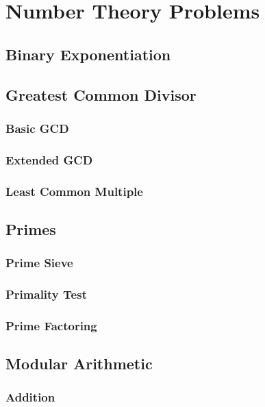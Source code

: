 \section{Number Theory Problems}

\subsection{Binary Exponentiation}

\subsection{Greatest Common Divisor}

\subsubsection{Basic GCD}

\subsubsection{Extended GCD}

\subsubsection{Least Common Multiple}

\subsection{Primes}

\subsubsection{Prime Sieve}

\subsubsection{Primality Test}

\subsubsection{Prime Factoring}

\subsection{Modular Arithmetic}

\subsubsection{Addition}

